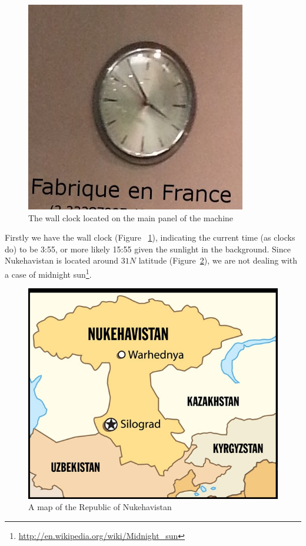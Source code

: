 \begin{figure}[h]
	\centering
	\includegraphics[width=0.8\columnwidth]{img/clock.jpg}
	\caption{The wall clock located on the main panel of the machine}
	\label{fig:clock}
\end{figure}

Firstly we have the wall clock (Figure ~\ref{fig:clock}), indicating the current time (as clocks do) to be 3:55, or more likely 15:55 given the sunlight in the background. Since Nukehavistan is located around $31N$ latitude (Figure~\ref{fig:map}), we are not dealing with a case of midnight sun\footnote{\url{http://en.wikipedia.org/wiki/Midnight_sun}}.

\begin{figure}
	\centering
	\includegraphics[width=0.8\columnwidth]{img/nukehavistan.jpg}
	\caption[A map of the Republic of Nukehavistan]{A map of the Republic of Nukehavistan \protect \footnotemark}
	\label{fig:map}
\end{figure}


